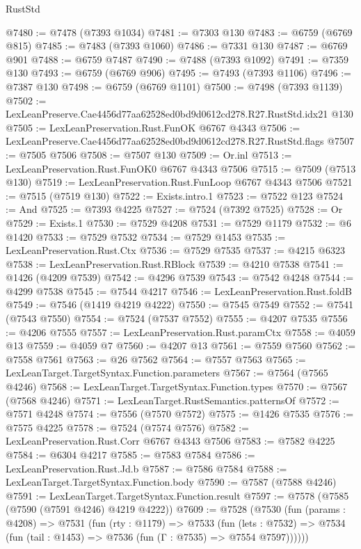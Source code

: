 \begin{lexlean}{RustStd}
\begin{coremodule}
@7480 := @7478 (@7393 @1034)
@7481 := @7303 @130
@7483 := @6759 (@6769 @815)
@7485 := @7483 (@7393 @1060)
@7486 := @7331 @130
@7487 := @6769 @901
@7488 := @6759 @7487
@7490 := @7488 (@7393 @1092)
@7491 := @7359 @130
@7493 := @6759 (@6769 @906)
@7495 := @7493 (@7393 @1106)
@7496 := @7387 @130
@7498 := @6759 (@6769 @1101)
@7500 := @7498 (@7393 @1139)
@7502 := LexLeanPreserve.Cae4456d77aa62528ed0bd9d0612cd278.R27.RustStd.idx21 @130
@7505 := LexLeanPreservation.Rust.FunOK @6767 @4343
@7506 := LexLeanPreserve.Cae4456d77aa62528ed0bd9d0612cd278.R27.RustStd.flags
@7507 := @7505 @7506
@7508 := @7507 @130
@7509 := Or.inl
@7513 := LexLeanPreservation.Rust.FunOK0 @6767 @4343 @7506
@7515 := @7509 (@7513 @130)
@7519 := LexLeanPreservation.Rust.FunLoop @6767 @4343 @7506
@7521 := @7515 (@7519 @130)
@7522 := Exists.intro.{1}
@7523 := @7522 @123
@7524 := And
@7525 := @7393 @4225
@7527 := @7524 (@7392 @7525)
@7528 := Or
@7529 := Exists.{1}
@7530 := @7529 @4208
@7531 := @7529 @1179
@7532 := @6 @1420
@7533 := @7529 @7532
@7534 := @7529 @1453
@7535 := LexLeanPreservation.Rust.Ctx
@7536 := @7529 @7535
@7537 := @4215 @6323
@7538 := LexLeanPreservation.Rust.RBlock
@7539 := @4210 @7538
@7541 := @1426 (@4209 @7539)
@7542 := @4296 @7539
@7543 := @7542 @4248
@7544 := @4299 @7538
@7545 := @7544 @4217
@7546 := LexLeanPreservation.Rust.foldB
@7549 := @7546 (@1419 @4219 @4222)
@7550 := @7545 @7549
@7552 := @7541 (@7543 @7550)
@7554 := @7524 (@7537 @7552)
@7555 := @4207 @7535
@7556 := @4206 @7555
@7557 := LexLeanPreservation.Rust.paramCtx
@7558 := @4059 @13
@7559 := @4059 @7
@7560 := @4207 @13
@7561 := @7559 @7560
@7562 := @7558 @7561
@7563 := @26 @7562
@7564 := @7557 @7563
@7565 := LexLeanTarget.TargetSyntax.Function.parameters
@7567 := @7564 (@7565 @4246)
@7568 := LexLeanTarget.TargetSyntax.Function.types
@7570 := @7567 (@7568 @4246)
@7571 := LexLeanTarget.RustSemantics.patternsOf
@7572 := @7571 @4248
@7574 := @7556 (@7570 @7572)
@7575 := @1426 @7535
@7576 := @7575 @4225
@7578 := @7524 (@7574 @7576)
@7582 := LexLeanPreservation.Rust.Corr @6767 @4343 @7506
@7583 := @7582 @4225
@7584 := @6304 @4217
@7585 := @7583 @7584
@7586 := LexLeanPreservation.Rust.Jd.b
@7587 := @7586 @7584
@7588 := LexLeanTarget.TargetSyntax.Function.body
@7590 := @7587 (@7588 @4246)
@7591 := LexLeanTarget.TargetSyntax.Function.result
@7597 := @7578 (@7585 (@7590 (@7591 @4246) @4219 @4222))
@7609 := @7528
    (@7530
      (fun (params : @4208) =>
      @7531
        (fun (rty : @1179) =>
        @7533
          (fun (lets : @7532) =>
          @7534 (fun (tail : @1453) => @7536 (fun (Γ : @7535) => @7554 @7597))))))

\end{coremodule}
\end{lexlean}
